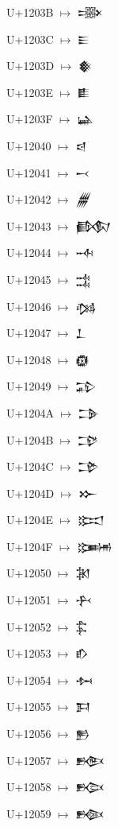 {\noindent U+1203B  $\mapsto$ {\cufont 𒀻}\par
\noindent U+1203C  $\mapsto$ {\cufont 𒀼}\par
\noindent U+1203D  $\mapsto$ {\cufont 𒀽}\par
\noindent U+1203E  $\mapsto$ {\cufont 𒀾}\par
\noindent U+1203F  $\mapsto$ {\cufont 𒀿}\par
\noindent U+12040  $\mapsto$ {\cufont 𒁀}\par
\noindent U+12041  $\mapsto$ {\cufont 𒁁}\par
\noindent U+12042  $\mapsto$ {\cufont 𒁂}\par
\noindent U+12043  $\mapsto$ {\cufont 𒁃}\par
\noindent U+12044  $\mapsto$ {\cufont 𒁄}\par
\noindent U+12045  $\mapsto$ {\cufont 𒁅}\par
\noindent U+12046  $\mapsto$ {\cufont 𒁆}\par
\noindent U+12047  $\mapsto$ {\cufont 𒁇}\par
\noindent U+12048  $\mapsto$ {\cufont 𒁈}\par
\noindent U+12049  $\mapsto$ {\cufont 𒁉}\par
\noindent U+1204A  $\mapsto$ {\cufont 𒁊}\par
\noindent U+1204B  $\mapsto$ {\cufont 𒁋}\par
\noindent U+1204C  $\mapsto$ {\cufont 𒁌}\par
\noindent U+1204D  $\mapsto$ {\cufont 𒁍}\par
\noindent U+1204E  $\mapsto$ {\cufont 𒁎}\par
\noindent U+1204F  $\mapsto$ {\cufont 𒁏}\par
\noindent U+12050  $\mapsto$ {\cufont 𒁐}\par
\noindent U+12051  $\mapsto$ {\cufont 𒁑}\par
\noindent U+12052  $\mapsto$ {\cufont 𒁒}\par
\noindent U+12053  $\mapsto$ {\cufont 𒁓}\par
\noindent U+12054  $\mapsto$ {\cufont 𒁔}\par
\noindent U+12055  $\mapsto$ {\cufont 𒁕}\par
\noindent U+12056  $\mapsto$ {\cufont 𒁖}\par
\noindent U+12057  $\mapsto$ {\cufont 𒁗}\par
\noindent U+12058  $\mapsto$ {\cufont 𒁘}\par
\noindent U+12059  $\mapsto$ {\cufont 𒁙}\par
}
